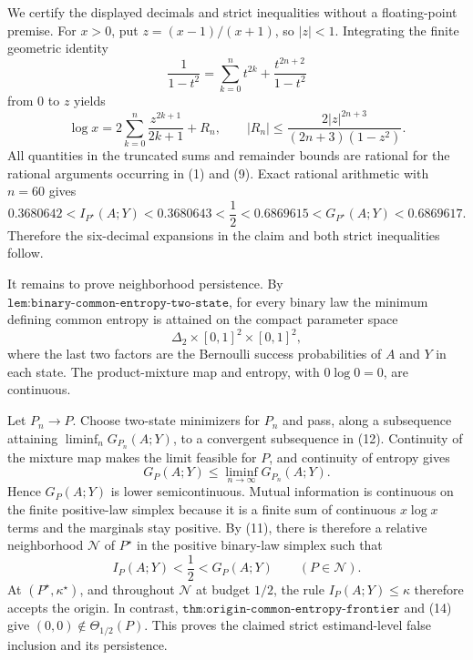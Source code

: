 We certify the displayed decimals and strict inequalities without a floating-point premise. For \(x>0\), put \(z=(x-1)/(x+1)\), so \(|z|<1\). Integrating the finite geometric identity
\[
\frac1{1-t^2}=\sum_{k=0}^{n}t^{2k}+\frac{t^{2n+2}}{1-t^2}
\]
from \(0\) to \(z\) yields
\[
\log x=2\sum_{k=0}^{n}\frac{z^{2k+1}}{2k+1}+R_n,
\qquad
|R_n|\leq
\frac{2|z|^{2n+3}}{(2n+3)(1-z^2)}.
\tag{10}
\]
All quantities in the truncated sums and remainder bounds are rational for the rational arguments occurring in (1) and (9). Exact rational arithmetic with \(n=60\) gives
\[
0.3680642<I_{P^\star}(A;Y)<0.3680643<\frac12
<0.6869615<G_{P^\star}(A;Y)<0.6869617.
\tag{11}
\]
Therefore the six-decimal expansions in the claim and both strict inequalities follow.

It remains to prove neighborhood persistence. By \(\texttt{lem:binary-common-entropy-two-state}\), for every binary law the minimum defining common entropy is attained on the compact parameter space
\[
\Delta_2\times[0,1]^2\times[0,1]^2,
\tag{12}
\]
where the last two factors are the Bernoulli success probabilities of \(A\) and \(Y\) in each state. The product-mixture map and entropy, with \(0\log0=0\), are continuous.

Let \(P_n\to P\). Choose two-state minimizers for \(P_n\) and pass, along a subsequence attaining \(\liminf_nG_{P_n}(A;Y)\), to a convergent subsequence in (12). Continuity of the mixture map makes the limit feasible for \(P\), and continuity of entropy gives
\[
G_P(A;Y)\leq\liminf_{n\to\infty}G_{P_n}(A;Y).
\tag{13}
\]
Hence \(G_P(A;Y)\) is lower semicontinuous. Mutual information is continuous on the finite positive-law simplex because it is a finite sum of continuous \(x\log x\) terms and the marginals stay positive. By (11), there is therefore a relative neighborhood \(\mathcal N\) of \(P^\star\) in the positive binary-law simplex such that
\[
I_P(A;Y)<\frac12<G_P(A;Y)
\qquad(P\in\mathcal N).
\tag{14}
\]
At \((P^\star,\kappa^\star)\), and throughout \(\mathcal N\) at budget \(1/2\), the rule \(I_P(A;Y)\leq\kappa\) therefore accepts the origin. In contrast, \(\texttt{thm:origin-common-entropy-frontier}\) and (14) give \((0,0)\notin\Theta_{1/2}(P)\). This proves the claimed strict estimand-level false inclusion and its persistence.